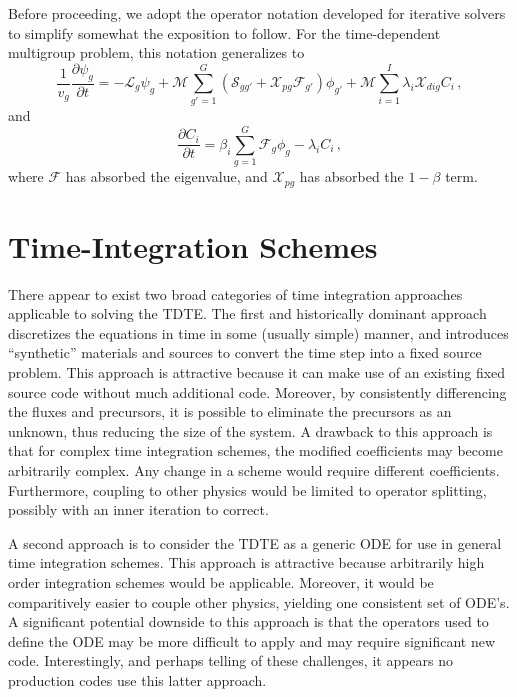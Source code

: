 Before proceeding, we adopt the operator notation developed 
for iterative solvers to simplify
somewhat the exposition to follow.
For the time-dependent multigroup problem, this notation generalizes to 
\begin{equation}
  \frac{1}{v_g} \frac{\partial \psi_g}{\partial t}
   = -\mathcal{L}_g\psi_g
     + \mathcal{M} \sum_{g'=1}^G 
         \left (
           \mathcal{S}_{gg'} + 
           \mathcal{X}_{pg} \mathcal{F}_{g'} 
         \right )\phi_{g'}
     +  \mathcal{M} \sum_{i=1}^{I} \lambda_i \mathcal{X}_{dig} C_i \, ,
\label{eq:tdteop}
\end{equation}
and
\begin{equation}
 \frac{\partial C_i}{\partial t} =  
  \beta_i \sum_{g=1}^G \mathcal{F}_{g} \phi_{g} - \lambda_i C_i \, ,
\label{eq:precop}
\end{equation}
where $\mathcal{F}$ has absorbed the eigenvalue, and
$\mathcal{X}_{pg} $ has absorbed the $1-\beta$ term.

\section{Time-Integration Schemes}

There appear to exist two broad categories of time integration 
approaches applicable to solving the TDTE.
The first and historically dominant approach discretizes
the equations in time in some (usually
simple) manner, and introduces ``synthetic'' materials and
sources to convert the time step into a fixed source problem.
This approach is attractive because it can make use of 
an existing fixed source code without much additional
code.  Moreover, by consistently differencing the
fluxes and precursors, it is possible to eliminate the 
precursors as an unknown, thus reducing the size of 
the system.  
A drawback to this approach is that for complex
time integration schemes, the modified coefficients may 
become arbitrarily complex. Any change in a scheme would
require different coefficients.  Furthermore, coupling
to other physics would be limited to operator splitting,
possibly with an inner iteration to correct.

A second approach is to consider the TDTE as a generic
ODE for use in general time integration schemes.  This
approach is attractive because arbitrarily high order
integration schemes would be applicable.  Moreover,
it would be comparitively easier to couple other 
physics, yielding one consistent set of ODE's.  
A significant potential downside to this approach is that
the operators used to define the ODE may be more 
difficult to apply and may require significant new
code.  
Interestingly, and perhaps telling of these challenges,
it appears no production codes use this latter approach.


